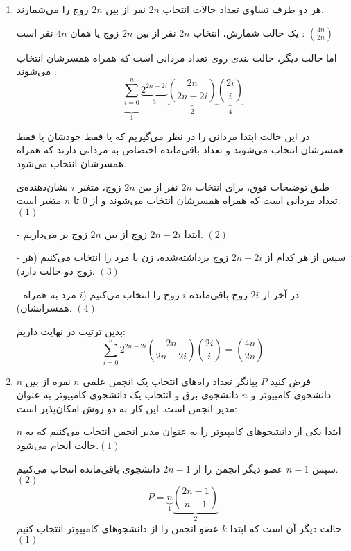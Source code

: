    \begin{enumerate}
        \item 
        \p
        هر دو طرف تساوی تعداد حالات انتخاب
        $2n$
        نفر از بین
        $2n$
        زوج را می‌شمارند.
        
        \p
        یک حالت شمارش، انتخاب $2n$ نفر از بین $2n$ زوج یا همان $4n$ نفر است : $\binom{4n}{2n}$
        
        \p
        اما حالت دیگر، حالت بندی روی تعداد مردانی است که همراه همسرشان انتخاب می‌شوند :
        $$\underbrace{\sum\limits_{i=0}^{n}}_1 \underbrace{2^{2n-2i}}_3  \underbrace{\binom{2n}{2n-2i}}_2 \underbrace{\binom{2i}{i}}_4$$
        
        در این حالت ابتدا مردانی را در نظر می‌گیریم که یا فقط خودشان یا فقط همسرشان انتخاب می‌شوند و تعداد باقی‌مانده اختصاص به مردانی دارند که همراه همسرشان انتخاب می‌شود.
        
        \p
        طبق توضیحات فوق، برای انتخاب 
        $2n$
        نفر از بین
        $2n$
        زوج، متغیر
        $i$
        نشان‌دهنده‌ی
        تعداد مردانی است که همراه همسرشان انتخاب می‌شوند و از 0 تا $n$ متغیر است. $(1)$
        
        -
        ابتدا $2n-2i$ زوج از بین $2n$ زوج بر می‌داریم. $(2)$
        
        -
        سپس از هر کدام از $2n-2i$ زوج برداشته‌شده، زن یا مرد را انتخاب می‌کنیم (هر زوج دو حالت دارد). $(3)$
        
        -
        در آخر از $2i$ زوج باقی‌مانده $i$ زوج را انتخاب می‌کنیم ($i$ مرد به همراه همسرانشان). $(4)$
        
        \p
        بدین ترتیب در نهایت داریم:
        $$\sum\limits_{i=0}^{n} 2^{2n-2i} \binom{2n}{2n-2i} \binom{2i}{i} = \binom{4n}{2n}$$
        \item
    
        فرض کنید
        $P$
        بیانگر تعداد راه‌های انتخاب یک انجمن علمی
        $n$
        نفره از بین
        $n$
        دانشجوی کامپیوتر و 
        $n$
        دانشجوی برق و انتخاب یک دانشجوی کامپیوتر به عنوان مدیر انجمن است. این کار به دو روش امکان‌پذیر است:
        
        ابتدا یکی از دانشجو‌های کامپیوتر را به عنوان مدیر انجمن انتخاب می‌کنیم که به 
        $n$
        حالت انجام می‌شود.$(1)$
        
        سپس 
        $n-1$
        عضو دیگر انجمن را از
        $2n-1$
        دانشجوی باقی‌مانده انتخاب می‌کنیم.$(2)$
        $$P = \underbrace{n}_1 \underbrace{\binom{2n-1}{n-1}}_2$$
        حالت دیگر آن است که ابتدا 
        $k$
        عضو انجمن را از دانشجو‌های کامپیوتر 
        انتخاب کنیم.$(1)$
        

\end{enumerate}
